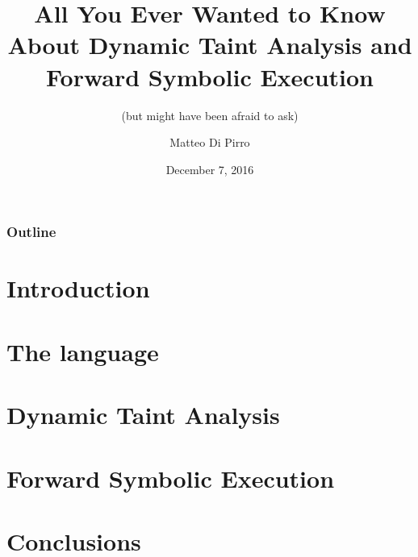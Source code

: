 \documentclass{beamer}
\title{All You Ever Wanted to Know About Dynamic Taint Analysis and Forward Symbolic Execution}
\subtitle{(but might have been afraid to ask)}
\author{Matteo Di Pirro}
\date{December 7, 2016}
\institute{University of Padova}
\begin{document}
\begin{frame}
\titlepage
\end{frame}

\begin{frame}
	\frametitle{Outline}
	\tableofcontents
\end{frame}

\section{Introduction}
%




\section{The language}


\section{Dynamic Taint Analysis}





\section{Forward Symbolic Execution}




\section{Conclusions}



\appendix
\makethanks
\end{document}
